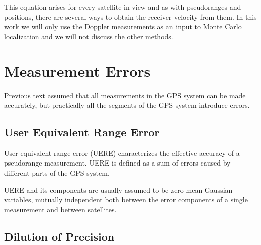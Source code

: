 This equation arises for every satellite in view and
as with pseudoranges and positions, there are several ways to obtain the receiver velocity
from them.
In this work we will only use the Doppler measurements as an input to Monte Carlo localization
and we will not discuss the other methods.

\section{Measurement Errors}
\label{sec:gps-errors}

Previous text assumed that all measurements in the GPS system can be made accurately,
but practically all the segments of the GPS system introduce errors.

\subsection{User Equivalent Range Error}
\label{sec:gps-uere}


User equivalent range error (UERE) characterizes the effective accuracy of a pseudorange measurement.
UERE is defined as a sum of errors caused by different parts of the GPS system.

UERE and its components are usually assumed to be zero mean Gaussian variables,
mutually independent both between the error components of a single measurement and between satellites.

\subsection{Dilution of Precision}
\label{sec:gps-dop}

